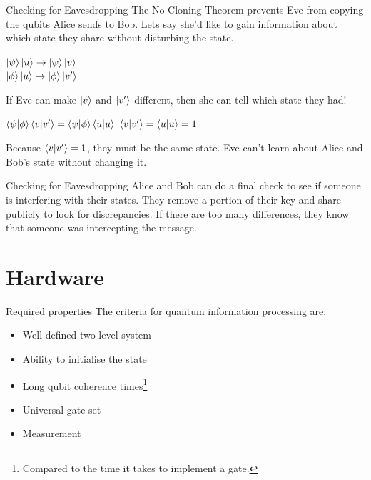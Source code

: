 \documentclass{beamer}
\begin{document}
\begin{frame}{Checking for Eavesdropping}
    The No Cloning Theorem prevents Eve from copying the qubits Alice sends to Bob.\vfill
    Lets say she'd like to gain information about which state they share without disturbing the state.\vfill
    \begin{center}
    \begin{math}
        \ket{\psi}\ket{u} \to \ket{\psi}\ket{v}
    \end{math}\\
    \begin{math}
        \ket{\phi}\ket{u} \to \ket{\phi}\ket{v'}
    \end{math}\vfill
    \end{center}    
    \pause

    If Eve can make $\ket{v}$ and $\ket{v'}$ different, then she can tell which state they had!
    \pause
    \begin{center}
    \begin{math}
        \braket{\psi}{\phi}\braket{v}{v'} = \braket{\psi}{\phi}\braket{u}{u}
    \end{math}\vfill
    \begin{math}
        \braket{v}{v'} = \braket{u}{u} = 1
    \end{math}\vfill
    \end{center}
    \pause
Because $\braket{v}{v'} = 1$, they must be the same state. Eve can't learn about Alice and Bob's state without changing it.
\end{frame}

\begin{frame}{Checking for Eavesdropping}
    Alice and Bob can do a final check to see if someone is interfering with their states.\vfill
    \pause
    They remove a portion of their key and share publicly to look for discrepancies.\vfill
    \pause
    If there are too many differences, they know that someone was intercepting the message.\vfill
\end{frame}

\section{Hardware}

\begin{frame}{Required properties}
    The criteria for quantum information processing are:
    \begin{itemize}
        \item Well defined two-level system
        \item Ability to initialise the state
        \item Long qubit coherence times\footnote{Compared to the time it takes to implement a gate.}
        \item Universal gate set
        \item Measurement
    \end{itemize}
\end{frame}
\end{document}
